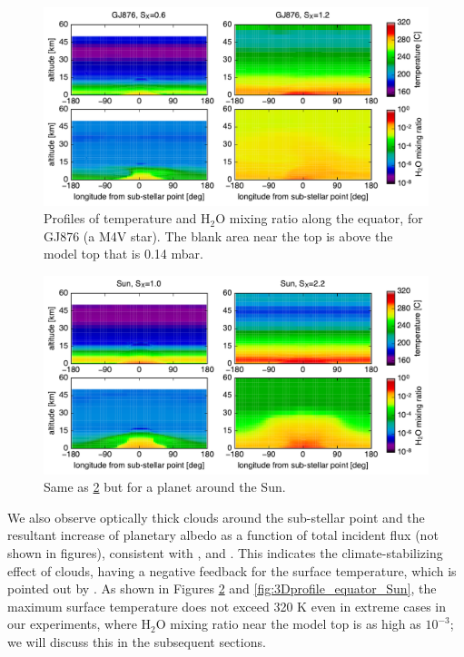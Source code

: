 \documentclass[11pt,numberedappendix,twocolappendix,]{emulateapj}
\def\water{H$_2$O }
\begin{document}
\begin{figure}[!hbt]
    \begin{center}
\includegraphics[width=\hsize]{fig/AqOH0TLS_GJ876_temp_xH2O.pdf}
    \end{center}
    \caption{Profiles of temperature and \water mixing ratio along the equator, for GJ876 (a M4V star). The blank area near the top is above the model top that is  0.14 mbar. }
\label{fig:3Dprofile_equator_GJ876}
\end{figure}

\begin{figure}[!hbt]
    \begin{center}
\includegraphics[width=\hsize]{fig/AqOH0TLS_Sun_temp_xH2O.pdf}
    \end{center}
    \caption{Same as \ref{fig:3Dprofile_equator_GJ876} but for a planet around the Sun.}
\label{fig:3Dprofile_equator_GJ876}
\end{figure}

We also observe optically thick clouds around the sub-stellar point and the resultant increase of planetary albedo as a function of total incident flux (not shown in figures), consistent with \citet{Yang2013,Yang2014}, \citet{Kopparapu2016} and \citet{Way2016}. 
This indicates the climate-stabilizing effect of clouds, having a negative feedback for the surface temperature, which is pointed out by \citet{Yang2013}. 
As shown in Figures \ref{fig:3Dprofile_equator_GJ876} and \ref{fig:3Dprofile_equator_Sun}, the maximum surface temperature does not exceed 320 K even in extreme cases in our experiments, where \water mixing ratio near the model top is as high as $10^{-3}$; we will discuss this in the subsequent sections. 
\end{document}
